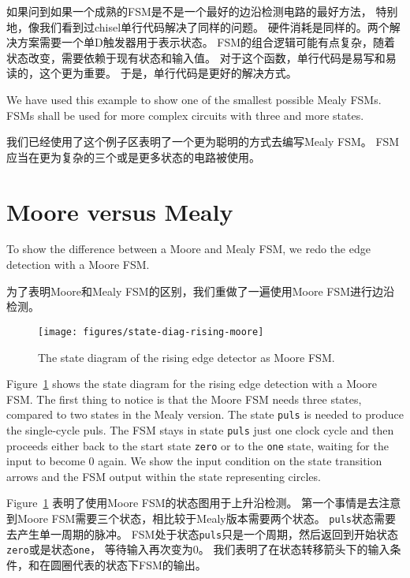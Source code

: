 \documentclass[%
    10pt,
    headinclude, footexclude,
    openright, %
    notitlepage,
    cleardoubleempty,
    headsepline,
    pointlessnumbers,
    bibtotoc, idxtotoc,
    ]{scrbook}
\newcommand{\code}[1]{{\small{\texttt{#1}}}}
\newcommand{\scale}{0.7}
\begin{document}
如果问到如果一个成熟的FSM是不是一个最好的边沿检测电路的最好方法，
特别地，像我们看到过chisel单行代码解决了同样的问题。
硬件消耗是同样的。两个解决方案需要一个单D触发器用于表示状态。
FSM的组合逻辑可能有点复杂，随着状态改变，需要依赖于现有状态和输入值。
对于这个函数，单行代码是易写和易读的，这个更为重要。
于是，单行代码是更好的解决方式。

We have used this example to show one of the smallest possible Mealy FSMs.
FSMs shall be used for more complex circuits with three and more states.

我们已经使用了这个例子区表明了一个更为聪明的方式去编写Mealy FSM。
FSM应当在更为复杂的三个或是更多状态的电路被使用。

\section{Moore versus Mealy}

To show the difference between a Moore and Mealy FSM, we redo the edge
detection with a Moore FSM. 

为了表明Moore和Mealy FSM的区别，我们重做了一遍使用Moore FSM进行边沿检测。

\begin{figure}
  \centering
  \texttt{[image: figures/state-diag-rising-moore]}
  \caption{The state diagram of the rising edge detector as Moore FSM.}
  \label{fig:diag:rising:moore}
\end{figure}

Figure~\ref{fig:diag:rising:moore} shows the state diagram for the rising
edge detection with a Moore FSM. The first thing to notice is that the Moore FSM
needs three states, compared to two states in the Mealy version.
The state \code{puls} is needed to produce the single-cycle puls.
The FSM stays in state \code{puls} just one clock cycle and then
proceeds either back to the start state \code{zero} or to the \code{one}
state, waiting for the input to become 0 again.
We show the input condition on the state transition arrows and the
FSM output within the state representing circles.

Figure~\ref{fig:diag:rising:moore} 表明了使用Moore FSM的状态图用于上升沿检测。
第一个事情是去注意到Moore FSM需要三个状态，相比较于Mealy版本需要两个状态。
\code{puls}状态需要去产生单一周期的脉冲。
FSM处于状态\code{puls}只是一个周期，然后返回到开始状态\code{zero}或是状态\code{one}，
等待输入再次变为0。
我们表明了在状态转移箭头下的输入条件，和在圆圈代表的状态下FSM的输出。

\end{document}
